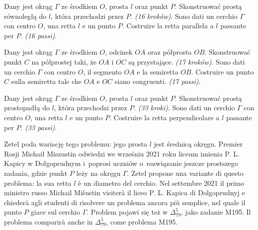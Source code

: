 \begin{problem}
    Dany jest okrąg $\Gamma$ ze środkiem $O$, prosta $l$ oraz punkt $P$. %
    Skonstruować prostą równoległą do $l$, która przechodzi przez $P$. %
    \hfill \emph{(16 kroków)}. %
    Sono dati un cerchio $\Gamma$ con centro $O$, una retta $l$ e un punto $P$. %
    Costruire la retta parallela a $l$ passante per $P$. %
    \hfill \emph{(16 passi)}. %
\end{problem}

\begin{problem}
    Dany jest okrąg $\Gamma$ ze środkiem $O$, odcinek $OA$ oraz półprosta $OB$. %
    Skonstruować punkt $C$ na półprostej taki, że $OA$ i $OC$ są przystające. %
    \hfill \emph{(17 kroków)}. %
    Sono dati un cerchio $\Gamma$ con centro $O$, il segmento $OA$ e la semiretta $OB$. %
    Costruire un punto $C$ sulla semiretta tale che $OA$ e $OC$ siano congruenti. %
    \hfill \emph{(17 passi)}. %
\end{problem}

\begin{problem}
    Dany jest okrąg $\Gamma$ ze środkiem $O$, prosta $l$ oraz punkt $P$. %
    Skonstruować prostą prostopadłą do $l$, która przechodzi przez $P$. %
    \hfill \emph{(33 kroki)}. %
    Sono dati un cerchio $\Gamma$ con centro $O$, una retta $l$ e un punto $P$. %
    Costruire la retta perpendicolare a $l$ passante per $P$. %
    \hfill \emph{(33 passi)}. %
\end{problem}

Zetel \cite[s. 17]{zetel_2020} poda wariację tego problemu: jego prosta $l$ jest średnicą okręgu. %
Premier Rosji Michaił Miszustin odwiedzi we wrześniu 2021 roku liceum imienia P. L. Kapicy w Dołgoprudnym i~poprosi uczniów o~rozwiązanie jeszcze prostszego zadania, gdzie punkt $P$ leży na okręgu $\Gamma$. %
Zetel \cite[p. 17]{zetel_2020} propone una variante di questo problema: la sua retta $l$ è un diametro del cerchio. %
Nel settembre 2021 il primo ministro russo Michail Mišustin visiterà il liceo P. L. Kapica di Dolgoprudnyj e chiederà agli studenti di risolvere un problema ancora più semplice, nel quale il punto $P$ giace sul cerchio $\Gamma$. %
Problem pojawi się też w $\Delta_{79}^{5}$, jako zadanie M195. %
Il problema comparirà anche in $\Delta_{79}^{5}$, come problema M195. %

